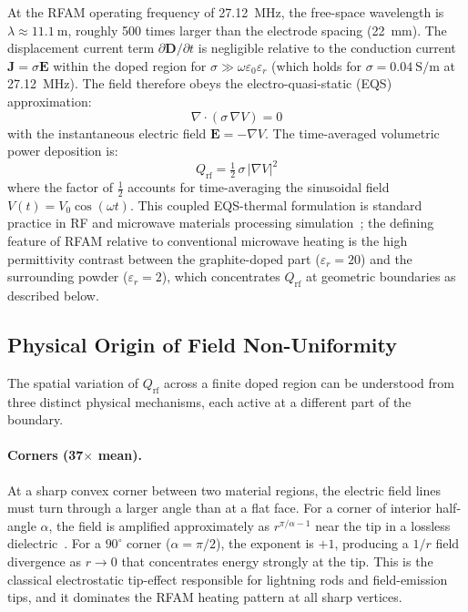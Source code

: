 \documentclass[5p,times]{elsarticle}
\newcommand{\Qrf}{Q_{\mathrm{rf}}}
\newcommand{\vect}[1]{\boldsymbol{#1}}
\newcommand{\half}{\tfrac{1}{2}}
\begin{document}
At the RFAM operating frequency of \SI{27.12}{\mega\hertz}, the free-space
wavelength is $\lambda \approx \SI{11.1}{\meter}$, roughly 500 times
larger than the electrode spacing (\SI{22}{\milli\meter}).  The
displacement current term $\partial\vect{D}/\partial t$ is negligible
relative to the conduction current $\vect{J} = \sigma\vect{E}$ within
the doped region for $\sigma \gg \omega\varepsilon_0\varepsilon_r$
(which holds for $\sigma = \SI{0.04}{\siemens\per\meter}$ at
\SI{27.12}{\mega\hertz}).  The field therefore obeys the
electro-quasi-static (EQS) approximation:
\begin{equation}
  \nabla \cdot (\sigma\,\nabla V) = 0
  \label{eq:eqs_pde}
\end{equation}
with the instantaneous electric field $\vect{E} = -\nabla V$.  The
time-averaged volumetric power deposition is:
\begin{equation}
  \Qrf = \half\,\sigma\,|\nabla V|^{2}
  \label{eq:qrf}
\end{equation}
where the factor of $\half$ accounts for time-averaging the sinusoidal
field $V(t) = V_0\cos(\omega t)$.  This coupled EQS-thermal formulation
is standard practice in RF and microwave materials processing
simulation~\cite{DielectricCeramicsPolymers,ferdous2017rfheating}; the
defining feature of RFAM relative to conventional microwave heating is
the high permittivity contrast between the graphite-doped part
($\varepsilon_r = 20$) and the surrounding powder ($\varepsilon_r = 2$),
which concentrates $\Qrf$ at geometric boundaries as described below.

\subsection{Physical Origin of Field Non-Uniformity}

The spatial variation of $\Qrf$ across a finite doped region can be
understood from three distinct physical mechanisms, each active at a
different part of the boundary.

\paragraph{Corners (37$\times$ mean).}
At a sharp convex corner between two material regions, the electric
field lines must turn through a larger angle than at a flat face.
For a corner of interior half-angle $\alpha$, the field is
amplified approximately as $r^{\pi/\alpha - 1}$ near the tip in a
lossless dielectric~\cite{Meixner1972singular}.  For a $90^\circ$
corner ($\alpha = \pi/2$), the exponent is $+1$, producing a $1/r$
field divergence as $r \to 0$ that concentrates energy strongly at
the tip.  This is the classical electrostatic tip-effect responsible
for lightning rods and field-emission tips, and it dominates the RFAM
heating pattern at all sharp vertices.
\end{document}
